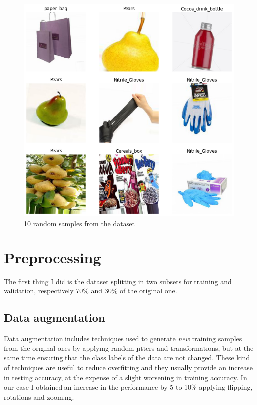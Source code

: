 \documentclass[11pt]{article}
\begin{document}
	\begin{figure}[H]
		\centering
		\includegraphics[width=\textwidth]{assets/dataset_samples.png}
		\caption{10 random samples from the dataset}
	\end{figure}



	\section{Preprocessing}
	The first thing I did is the dataset splitting in two subsets for training and validation,
	respectively 70\% and 30\% of the original one.


	\subsection{Data augmentation}
	Data augmentation includes techniques used to generate \textit{new} training
	samples from the original ones by applying random jitters and transformations,
	but at the same time ensuring that the class labels of the data are not changed.
	These kind of techniques are useful to reduce overfitting and they usually provide
	an increase in testing accuracy, at the expense of a slight worsening in training accuracy.
	In our case I obtained an increase in the performance by 5 to 10\% applying
	flipping, rotations and zooming.
	
\end{document}
